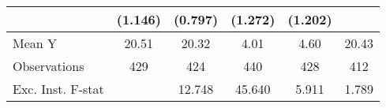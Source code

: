 {\begin{tabular}{l*{5}{c}}
            &     (1.146)         &     (0.797)         &     (1.272)         &     (1.202)         &                     \\
\midrule
Mean Y      &       20.51         &       20.32         &        4.01         &        4.60         &       20.43         \\
Observations&         429         &         424         &         440         &         428         &         412         \\
Exc. Inst. F-stat&                     &      12.748         &      45.640         &       5.911         &       1.789         \\
\bottomrule
\end{tabular}
}

